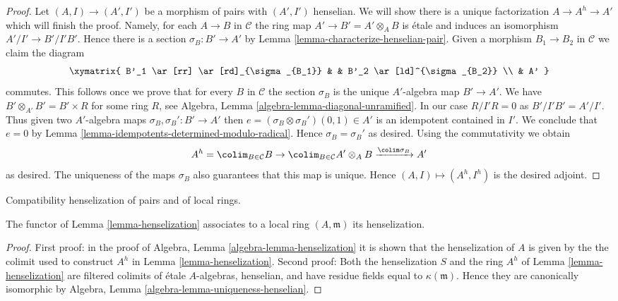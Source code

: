 \begin{proof}
\medskip\noindent
Let $(A, I) \to (A', I')$ be a morphism of pairs with $(A', I')$ henselian.
We will show there is a unique factorization $A \to A^h \to A'$ which will
finish the proof. Namely, for each $A \to B$ in $\mathcal{C}$
the ring map $A' \to B' = A' \otimes_A B$ is \'etale and induces
an isomorphism $A'/I' \to B'/I'B'$. Hence there is a section
$\sigma_B : B' \to A'$ by Lemma \ref{lemma-characterize-henselian-pair}.
Given a morphism $B_1 \to B_2$ in $\mathcal{C}$ we claim the diagram
$$
\xymatrix{
B'_1 \ar[rr] \ar[rd]_{\sigma_{B_1}} & &
B'_2 \ar[ld]^{\sigma_{B_2}} \\
& A'
}
$$
commutes. This follows once we prove that for every $B$ in $\mathcal{C}$
the section $\sigma_B$ is the unique $A'$-algebra map $B' \to A'$.
We have $B' \otimes_{A'} B' = B' \times R$ for some ring $R$, see
Algebra, Lemma \ref{algebra-lemma-diagonal-unramified}. In our case
$R/I'R = 0$ as $B'/I'B' = A'/I'$. Thus given two $A'$-algebra maps
$\sigma_B, \sigma_B' : B' \to A'$ then
$e = (\sigma_B \otimes \sigma_B')(0, 1) \in A'$
is an idempotent contained in $I'$. We conclude that $e = 0$
by Lemma \ref{lemma-idempotents-determined-modulo-radical}.
Hence $\sigma_B = \sigma_B'$ as desired.
Using the commutativity we obtain
$$
A^h = \colim_{B \in \mathcal{C}} B \to
\colim_{B \in \mathcal{C}} A' \otimes_A B \xrightarrow{\colim \sigma_B} A'
$$
as desired. The uniqueness of the maps $\sigma_B$ also guarantees that
this map is unique. Hence $(A, I) \mapsto (A^h, I^h)$ is the desired adjoint.
\end{proof}

\begin{lemma}
\label{lemma-henselization-local-ring}
\begin{slogan}
Compatibility henselization of pairs and of local rings.
\end{slogan}
The functor of Lemma \ref{lemma-henselization} associates to a local ring
$(A, \mathfrak m)$ its henselization.
\end{lemma}

\begin{proof}
First proof: in the proof of
Algebra, Lemma \ref{algebra-lemma-henselization}
it is shown that the henselization of $A$ is given by the
the colimit used to construct $A^h$ in
Lemma \ref{lemma-henselization}.
Second proof: Both the henselization $S$ and the ring $A^h$ of
Lemma \ref{lemma-henselization} are filtered colimits of \'etale
$A$-algebras, henselian, and have residue fields equal to
$\kappa(\mathfrak m)$. Hence they are canonically isomorphic by
Algebra, Lemma \ref{algebra-lemma-uniqueness-henselian}.
\end{proof}

